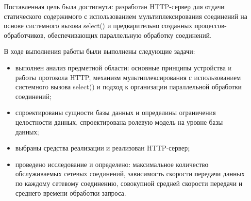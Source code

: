 
Поставленная цель была достигнута: разработан HTTP-сервер для отдачи статического содержимого с использованием мультиплексирования соединений на основе системного вызова select() и предварительно созданных процессов-обработчиков, обеспечивающих параллельную обработку соединений.
    
В ходе выполнения работы были выполнены следующие задачи:
\begin{itemize}
	\item выполнен анализ предметной области: основные принципы устройства и работы протокола HTTP, механизм мультиплексирования с использованием системного вызова select() и подход к организации параллельной обработки соединений;
	\item спроектированы сущности базы данных и определины ограничения целостности данных, спроектирована ролевую модель на уровне базы данных;
	\item выбраны средства реализации и реализован HTTP-сервер;
	\item проведено исследование и определено: максимальное количество обслуживаемых сетевых соединений, зависимость скорости передачи данных по каждому сетевому соединению, совокупной средней скорости передачи и среднего времени обработки запроса.
\end{itemize}
\clearpage
